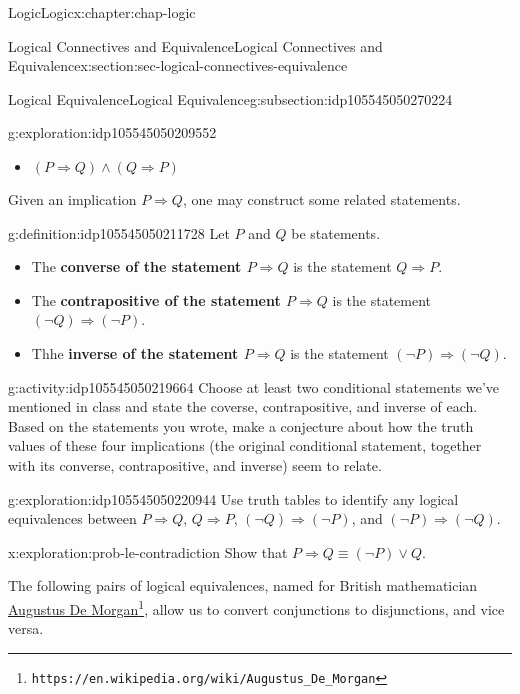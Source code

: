 \documentclass[oneside,10pt,]{book}
\newcommand{\terminology}[1]{\textbf{#1}}
\begin{document}
\begin{chapterptx}{Logic}{}{Logic}{}{}{x:chapter:chap-logic}
\begin{sectionptx}{Logical Connectives and Equivalence}{}{Logical Connectives and Equivalence}{}{}{x:section:sec-logical-connectives-equivalence}
\begin{subsectionptx}{Logical Equivalence}{}{Logical Equivalence}{}{}{g:subsection:idp105545050270224}
\begin{exploration}{}{g:exploration:idp105545050209552}
\begin{itemize}[label=\textbullet]
\item{}\(\displaystyle (P\Rightarrow Q)\land (Q\Rightarrow P)\)%
\end{itemize}
\end{exploration}%
Given an implication \(P\Rightarrow Q\), one may construct some related statements.%
\begin{definition}{}{g:definition:idp105545050211728}%
%
%
%
%
%
%
Let \(P\) and \(Q\) be statements.%
%
\begin{itemize}[label=\textbullet]
\item{}The \terminology{converse of the statement \(P\Rightarrow Q\)} is the statement \(Q\Rightarrow P\).%
\item{}The \terminology{contrapositive of the statement \(P\Rightarrow Q\)} is the statement \((\neg Q)\Rightarrow (\neg P)\).%
\item{}Thhe \terminology{inverse of the statement \(P\Rightarrow Q\)} is the statement \((\neg P)\Rightarrow (\neg Q)\).%
\end{itemize}
\end{definition}
\begin{activity}{}{g:activity:idp105545050219664}%
Choose at least two conditional statements we've mentioned in class and state the coverse, contrapositive, and inverse of each. Based on the statements you wrote, make a conjecture\footnotemark{} about how the truth values of these four implications (the original conditional statement, together with its converse, contrapositive, and inverse) seem to relate.%
\end{activity}%
%
\begin{exploration}{}{g:exploration:idp105545050220944}%
Use truth tables to identify any logical equivalences between \(P\Rightarrow Q\), \(Q\Rightarrow P\), \((\neg Q)\Rightarrow (\neg P)\), and \((\neg P)\Rightarrow (\neg Q)\).%
\end{exploration}%
\begin{exploration}{}{x:exploration:prob-le-contradiction}%
Show that \(P\Rightarrow Q \equiv (\neg P) \lor Q\).%
\end{exploration}%
The following pairs of logical equivalences, named for British mathematician \href{https://en.wikipedia.org/wiki/Augustus_De_Morgan}{Augustus De Morgan}\footnote{\nolinkurl{https://en.wikipedia.org/wiki/Augustus_De_Morgan}\label{g:fn:idp105545050224656}}, allow us to convert conjunctions to disjunctions, and vice versa.%

\end{subsectionptx}
\end{sectionptx}
\end{chapterptx}
\end{document}
